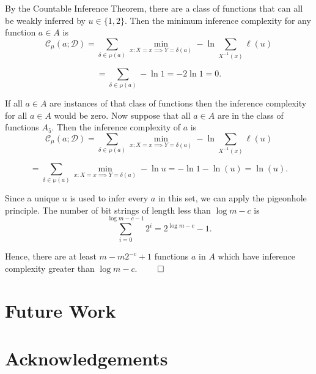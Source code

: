 \documentclass[11pt]{article}
\begin{document}
By the Countable Inference Theorem, there are a class of functions that can all be weakly inferred by $ u \in \{1, 2\} $. 
Then the minimum inference complexity for any function $ a \in A $ is 
$$ \mathcal{C}_{\mu}(a ; \mathcal{D}) = \sum_{\delta \in \wp(a)} \min_{x : X = x \implies Y = \delta(a) }- \ln \sum_{X^{-1}(x)} {\ell(u)} $$

$$ = \sum_{\delta \in \wp(a)} - \ln {1}  = - 2\ln {1} = 0. $$

If all $ a \in A $ are instances of that class of functions then the inference complexity for all $ a \in A $ would be zero. Now suppose that all $ a \in A $ are in the class of functions $ A_5 $. Then the inference complexity of $ a $ is
$$ \mathcal{C}_{\mu}(a ; \mathcal{D}) = \sum_{\delta \in \wp(a)} \min_{x : X = x \implies Y = \delta(a) } -\ln \sum_{X^{-1}(x)} {\ell(u)} $$

$$ = \sum_{\delta \in \wp(a)} \min_{x : X = x \implies Y = \delta(a) } - \ln {u} = - \ln 1 - \ln(u)  = \ln(u). $$

Since a unique $ u $ is used to infer every $ a $ in this set, we can apply the pigeonhole principle. The number of bit strings of length less than $ \log m - c $ is 
$$ \sum_{i = 0}^{\log m - c - 1} {2^i} = 2^{\log m - c} - 1. $$

Hence, there are at least $ m - m2^{-c} + 1 $ functions $ a $ in $ A $ which have inference complexity greater than $ \log m - c $. $ \hfill \qed $ \\




\newpage
\section{Future Work}
\newpage
\section{Acknowledgements}
\end{document}
